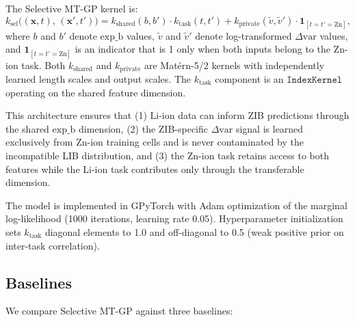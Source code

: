 \documentclass[12pt]{article}
\begin{document}
The Selective MT-GP kernel is:
\begin{equation}
  k_{\mathrm{sel}}\!\bigl((\mathbf{x}, t),\, (\mathbf{x}', t')\bigr)
  = k_{\mathrm{shared}}(b, b')\cdot k_{\mathrm{task}}(t, t')
  + k_{\mathrm{private}}(\tilde{v}, \tilde{v}')\cdot
    \mathbf{1}_{[t = t' = \mathrm{Zn}]},
  \label{eq:selective}
\end{equation}
where $b$ and $b'$ denote $\text{exp\_b}$ values, $\tilde{v}$ and $\tilde{v}'$
denote log-transformed $\Delta\mathrm{var}$ values, and
$\mathbf{1}_{[t = t' = \mathrm{Zn}]}$ is an indicator that is 1 only when both
inputs belong to the Zn-ion task. Both $k_{\mathrm{shared}}$ and
$k_{\mathrm{private}}$ are Mat\'ern-5/2 kernels with independently learned
length scales and output scales. The $k_{\mathrm{task}}$ component is an
$\texttt{IndexKernel}$ operating on the shared feature dimension.

This architecture ensures that (1) Li-ion data can inform ZIB predictions
through the shared $\text{exp\_b}$ dimension, (2) the ZIB-specific
$\Delta\mathrm{var}$ signal is learned exclusively from Zn-ion training cells
and is never contaminated by the incompatible LIB distribution, and (3) the
Zn-ion task retains access to both features while the Li-ion task contributes
only through the transferable dimension.

The model is implemented in GPyTorch \cite{gardner2018gpytorch} with Adam optimization of the marginal
log-likelihood (1000 iterations, learning rate 0.05). Hyperparameter
initialization sets $k_{\mathrm{task}}$ diagonal elements to 1.0 and
off-diagonal to 0.5 (weak positive prior on inter-task correlation).

\subsection{Baselines}

We compare Selective MT-GP against three baselines:
\end{document}
